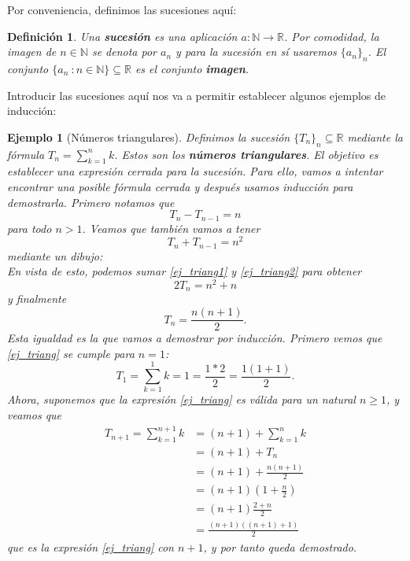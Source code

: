 \documentclass{article}
\newtheorem{define}{Definición}
\newtheorem{ejem}{Ejemplo}
\newcommand{\reales}{\mathbb{R}}
\newcommand{\sucreal}[1]{\{ #1 _n \}_n \subseteq \reales}
\begin{document}
Por conveniencia, definimos las sucesiones aquí:
\begin{define}
	Una \textbf{sucesión} es una aplicación $a: \mathbb{N} \rightarrow \mathbb{R}$. Por comodidad, la imagen de $n \in \mathbb{N}$ se denota por $a_n$ y para la sucesión en sí usaremos $\{a_n\}_n$. El conjunto $\{a_n\ : n \in \mathbb{N}\} \subseteq \mathbb{R}$ es el conjunto \textbf{imagen}. 
\end{define}
Introducir las sucesiones aquí nos va a permitir establecer algunos ejemplos de inducción:
\begin{ejem}[Números triangulares]
	Definimos la sucesión $\sucreal{T}$ mediante la fórmula $T_n = \sum_{k = 1}^{n} k$. Estos son los \textbf{números triangulares}. El objetivo es establecer una expresión cerrada para la sucesión. Para ello, vamos a intentar encontrar una posible fórmula cerrada y después usamos inducción para demostrarla. Primero notamos que
	\begin{equation}\label{ej_triang1}
		T_{n} - T_{n-1} = n 
	\end{equation}
	para todo $n > 1$. Veamos que también vamos a tener
	\begin{equation}\label{ej_triang2}
		T_{n} + T_{n-1} = n^2
	\end{equation}
	mediante un dibujo: \\ 
	En vista de esto, podemos sumar \eqref{ej_triang1} y \eqref{ej_triang2} para obtener
	\begin{equation*}
		2T_{n} = n^2 + n
	\end{equation*}
	y finalmente
	\begin{equation}\label{ej_triang}
		T_n = \frac{n(n+1)}{2}.
	\end{equation}
	Esta igualdad es la que vamos a demostrar por inducción. Primero vemos que \eqref{ej_triang} se cumple para $n=1$:
	\begin{equation*}
		T_1 = \sum_{k = 1}^{1} k = 1 = \frac{1*2}{2} = \frac{1(1+1)}{2}.
	\end{equation*}
	Ahora, suponemos que la expresión \eqref{ej_triang} es válida para un natural $n \geq 1$, y veamos que
	\begin{eqnarray*}
		T_{n+1} = \sum_{k = 1}^{n+1} k & = (n+1) + \sum_{k = 1}^{n} k \\ 
		& = (n+1) + T_n \\ 
		& = (n+1) + \frac{n(n+1)}{2} \\
		& = (n+1)(1+ \frac{n}{2}) \\  
		& = (n+1)\frac{2 + n}{2} \\  
		& = \frac{(n+1)((n+1) + 1)}{2}
	\end{eqnarray*}
	que es la expresión \eqref{ej_triang} con $n+1$, y por tanto queda demostrado.
\end{ejem}
\end{document}
